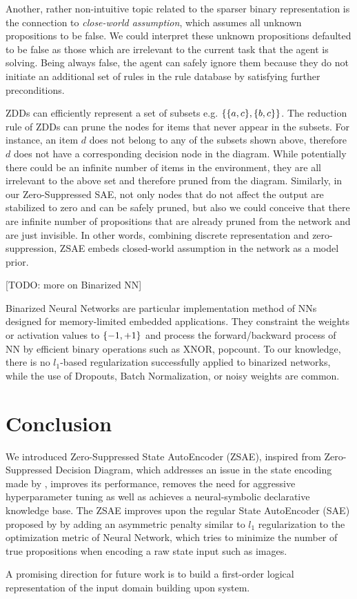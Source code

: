 Another, rather non-intuitive topic related to the sparser binary representation
is the connection to \emph{close-world assumption}, which assumes all unknown
propositions to be false.
% 
We could interpret these unknown propositions defaulted to be false as those which are irrelevant
to the current task that the agent is solving.
Being always false, the agent can safely ignore them because
they do not initiate an additional set of rules in the rule database by satisfying further preconditions.

ZDDs can efficiently represent a set of subsets e.g. ${\left\{{\left\{a,c\right\}},{\left\{b,c\right\}}\right\}}$.
The reduction rule of ZDDs can prune the nodes for items that never appear in the subsets.
For instance, an item $d$ does not belong to any of the subsets shown above, therefore $d$ does not have
a corresponding decision node in the diagram.
While potentially there could be an infinite number of items in the environment, they are 
all irrelevant to the above set and therefore pruned from the diagram.
% 
Similarly, in our Zero-Suppressed SAE, not only nodes that do not affect the output are stabilized to zero
and can be safely pruned, but also we could conceive that there are infinite number of propositions
that are already pruned from the network and are just invisible.
In other words, combining discrete representation and zero-suppression,
ZSAE embeds closed-world assumption in the network as a model prior.

[TODO: more on Binarized NN]

Binarized Neural Networks \cite{HubaraCSEB16} are particular implementation method of NNs designed for
memory-limited embedded applications. They constraint the weights or activation
values to ${\left\{-1,+1\right\}}$ and process the forward/backward process of NN by
efficient binary operations such as XNOR, popcount. 
To our knowledge, there is no $l_1$-based regularization successfully
applied to binarized networks, while the use of Dropouts, Batch Normalization, 
or noisy weights \cite{HubaraCSEB16} are common.

\section{Conclusion}
\label{conclusion}

We introduced Zero-Suppressed State AutoEncoder (ZSAE), inspired from
Zero-Suppressed Decision Diagram, which addresses an issue in the state
encoding made by \latentplanner, improves its performance, removes the need
for aggressive hyperparameter tuning as well as achieves a
neural-symbolic declarative knowledge base.  The ZSAE improves upon the
regular State AutoEncoder (SAE) proposed by \citeauthor{Asai2018} by
adding an asymmetric penalty similar to $l_1$ regularization to the optimization metric of
Neural Network, which tries to minimize the number of true propositions
when encoding a raw state input such as images.

A promising direction for future work is to build a first-order logical
representation of the input domain building upon \latentplanner system.

